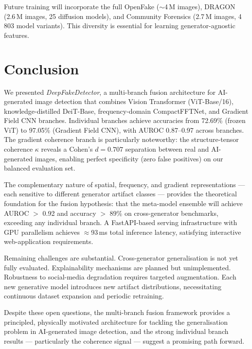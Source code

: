\documentclass[12pt, a4paper]{article}
\begin{document}
Future training will incorporate the full OpenFake ($\sim$4\,M images), DRAGON
(2.6\,M images, 25 diffusion models), and Community Forensics (2.7\,M images,
4\,803 model variants).  This diversity is essential for learning
generator-agnostic features.

\section{Conclusion}
\label{sec:conclusion}

We presented \textit{DeepFakeDetector}, a multi-branch fusion architecture for
AI-generated image detection that combines Vision Transformer (ViT-Base/16),
knowledge-distilled DeiT-Base, frequency-domain CompactFFTNet, and Gradient Field
CNN branches.  Individual branches achieve accuracies from 72.69\% (frozen ViT)
to 97.05\% (Gradient Field CNN), with AUROC 0.87–0.97 across branches.  The
gradient coherence branch is particularly noteworthy: the structure-tensor
coherence $\kappa$ reveals a Cohen's $d=0.707$ separation between real and
AI-generated images, enabling perfect specificity (zero false positives) on our
balanced evaluation set.

The complementary nature of spatial, frequency, and gradient representations —
each sensitive to different generator artifact classes — provides the theoretical
foundation for the fusion hypothesis: that the meta-model ensemble will achieve
AUROC $>$ 0.92 and accuracy $>$ 89\% on cross-generator benchmarks, exceeding
any individual branch.  A FastAPI-based serving infrastructure with GPU
parallelism achieves $\approx$93\,ms total inference latency, satisfying
interactive web-application requirements.

Remaining challenges are substantial.  Cross-generator generalisation is not yet
fully evaluated.  Explainability mechanisms are planned but unimplemented.
Robustness to social-media degradation requires targeted augmentation.  Each new
generative model introduces new artifact distributions, necessitating continuous
dataset expansion and periodic retraining.

Despite these open questions, the multi-branch fusion framework provides a
principled, physically motivated architecture for tackling the generalisation
problem in AI-generated image detection, and the strong individual branch
results — particularly the coherence signal — suggest a promising path forward.

\end{document}
